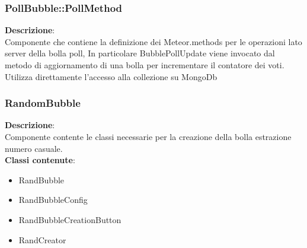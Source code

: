 \clearpage

\subsubsection{PollBubble::PollMethod}
\textbf{Descrizione}:\\
 Componente che contiene la definizione dei Meteor.methods per le operazioni lato server della bolla poll,  In particolare BubblePollUpdate viene invocato dal metodo di aggiornamento di una bolla per incrementare il contatore dei voti. Utilizza direttamente l'accesso alla collezione su MongoDb 


\clearpage

\subsubsection{RandomBubble}
   \FloatBarrier
\FloatBarrier
\textbf{Descrizione}:\\
 Componente contente le classi necessarie per la creazione della bolla estrazione numero casuale. 
\\ \textbf{Classi contenute}:\\
\begin{itemize}
\item RandBubble
\item RandBubbleConfig
\item RandBubbleCreationButton
\item RandCreator
\end{itemize}


